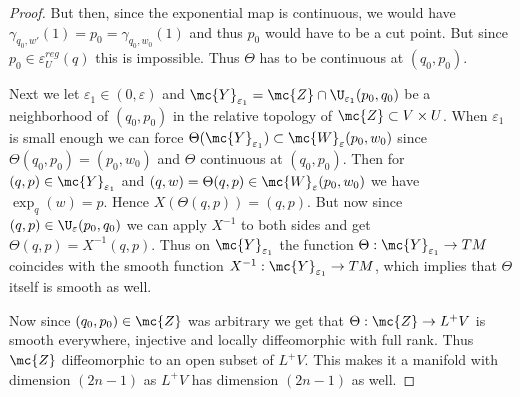 \begin{proof}
But then, since the exponential map is continuous, we would have $\gamma_{q_0,w'}(1)=p_0=\gamma_{q_0,w_0}(1)$ and thus $p_0$ would have to be a cut point. But since $p_0\in \varepsilon_U^{reg}(q)$ this is impossible.
Thus $\Theta$ has to be continuous at $(q_0,p_0)$.

Next we let $\varepsilon_1\in (0,\varepsilon)$ and $\mc{Y}_{\varepsilon_1}=\mc{Z}\cap\U_{\varepsilon_1}(p_0,q_0)$ be a neighborhood of $(q_0,p_0)$ in the relative topology of $\mc{Z}\subset V\times U$. When $\varepsilon_1$ is small enough we can force $\Theta(\mc{Y}_{\varepsilon_1})\subset \mc{W}_\varepsilon(p_0,w_0)$ since $\Theta(q_0,p_0)=(p_0,w_0)$ and $\Theta$ continuous at $(q_0,p_0)$. Then for $(q,p)\in \mc{Y}_{\varepsilon_1}$ and $(q,w) = \Theta(q,p)\in \mc{W}_\varepsilon(p_0,w_0)$ we have $\exp_q(w) = p$. Hence $X(\Theta(q,p))=(q,p)$. But now since $(q,p)\in \U_\varepsilon(p_0,q_0)$ we can apply $X^{-1}$ to both sides and get $\Theta(q,p)=X^{-1}(q,p)$. Thus on $\mc{Y}_{\varepsilon_1}$ the function $\Theta:\mc{Y}_{\varepsilon_1}\to TM$ coincides with the smooth function $X^{-1}:\mc{Y}_{\varepsilon_1}\to TM$, which implies that $\Theta$ itself is smooth as well.

Now since $(q_0,p_0)\in \mc{Z}$ was arbitrary we get that $\Theta:\mc{Z}\to L^+V$ is smooth everywhere, injective and locally diffeomorphic with full rank. Thus $\mc{Z}$ diffeomorphic to an open subset of $L^+V$. This makes it a manifold with dimension $(2n-1)$ as $L^+V$ has dimension $(2n-1)$ as well. 
\end{proof}

